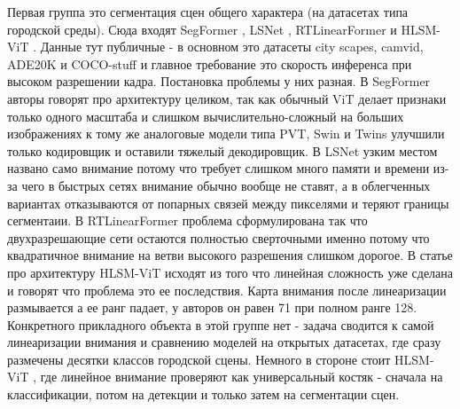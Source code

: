 \documentclass[areasetadvanced]{scrartcl}
\begin{document}
		Первая группа это сегментация сцен общего характера (на датасетах типа городской среды). Сюда входят SegFormer \cite{segformer}, LSNet \cite{lsnet}, RTLinearFormer \cite{rtlinearformer}
		и HLSM-ViT \cite{hlsmvit}. Данные тут публичные - в основном это датасеты city scapes, camvid, ADE20K и COCO-stuff и главное требование это
		скорость инференса при высоком разрешении кадра. Постановка проблемы у них разная. В SegFormer \cite{segformer} авторы говорят про архитектуру
		целиком, так как обычный ViT делает признаки только одного масштаба и слишком вычислительно-сложный на больших изображениях к тому же аналоговые модели типа PVT, 
		Swin и Twins улучшили только кодировщик
		и оставили тяжелый декодировщик. В LSNet \cite{lsnet} узким местом названо само внимание потому что требует слишком много памяти
		и времени из-за чего в быстрых сетях внимание обычно вообще не ставят, а в облегченных вариантах отказываются от попарных связей между
		пикселями и теряют границы сегментаии. В RTLinearFormer \cite{rtlinearformer} проблема сформулирована так что двухразрешающие сети остаются
		полностью сверточными именно потому что квадратичное внимание на ветви высокого разрешения слишком дорогое. В статье про архитектуру HLSM-ViT \cite{hlsmvit} исходят из 
		того что линейная сложность уже
		 сделана и говорят что проблема это ее последствия. Карта внимания после линеаризации
		размывается а ее ранг падает, у авторов он равен 71 при полном ранге 128.
		Конкретного прикладного объекта в этой группе нет - задача сводится к самой линеаризации внимания и сравнению моделей на открытых датасетах,
		где сразу размечены десятки классов городской сцены. Немного в стороне стоит HLSM-ViT \cite{hlsmvit}, где линейное внимание проверяют как
		универсальный костяк - сначала на классификации, потом на детекции и только затем на сегментации сцен.
\end{document}
